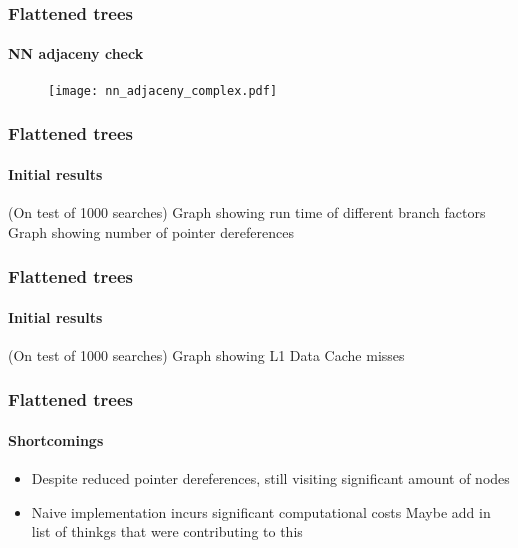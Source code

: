 \begin{frame}
  \frametitle{Flattened \kd trees}
  \framesubtitle{NN adjaceny check}

  \begin{figure}
    \centering
    \texttt{[image: nn\_adjaceny\_complex.pdf]}
  \end{figure}

\end{frame}

\begin{frame}
  \frametitle{Flattened \kd trees}
  \framesubtitle{Initial results}

  \color{white}
  (On test of 1000 searches)
  Graph showing run time of different branch factors
  Graph showing number of pointer dereferences

\end{frame}

\begin{frame}
  \frametitle{Flattened \kd trees}
  \framesubtitle{Initial results}

  \color{white}
  (On test of 1000 searches)
  Graph showing L1 Data Cache misses

\end{frame}

\begin{frame}
  \frametitle{Flattened \kd trees}
  \framesubtitle{Shortcomings}

  \begin{itemize}
    \item Despite reduced pointer dereferences, still visiting significant amount of nodes
    \item Naive implementation incurs significant computational costs 
       Maybe add in list of thinkgs that were contributing to this
  \end{itemize}

\end{frame}

